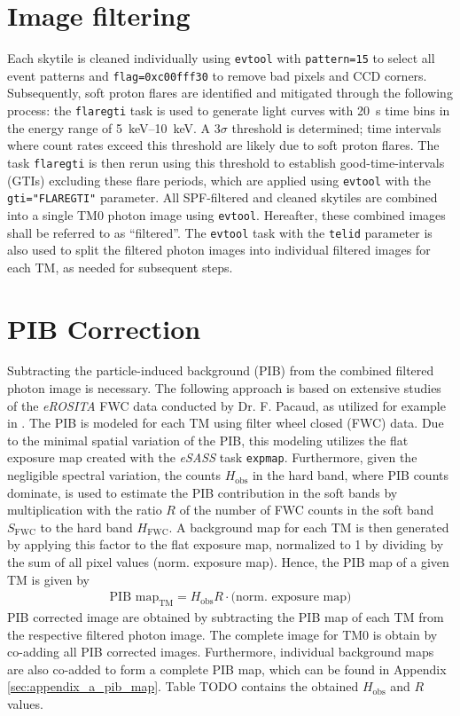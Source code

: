 \section{Image filtering}
Each skytile is cleaned individually using \texttt{evtool} with \texttt{pattern=15} to select all event patterns and \texttt{flag=0xc00fff30} to remove bad pixels and CCD corners. Subsequently, soft proton flares are identified and mitigated through the following process: the \texttt{flaregti} task is used to generate light curves with \SI{20}{\second} time bins in the energy range of \SIrange{5}{10}{\kilo\electronvolt}. A \(3\sigma\) threshold is determined; time intervals where count rates exceed this threshold are likely due to soft proton flares. The task \texttt{flaregti} is then rerun using this threshold to establish good-time-intervals (GTIs) excluding these flare periods, which are applied using \texttt{evtool} with the \texttt{gti="FLAREGTI"} parameter. All SPF-filtered and cleaned skytiles are combined into a single TM0 photon image using \texttt{evtool}. Hereafter, these combined images shall be referred to as \enquote{filtered}. The \texttt{evtool} task with the \texttt{telid} parameter is also used to split the filtered photon images into individual filtered images for each TM, as needed for subsequent steps.
%
\section{PIB Correction}
Subtracting the particle-induced background (PIB) from the combined filtered photon image is necessary. The following  approach is based on extensive studies of the \textit{eROSITA} FWC data conducted by Dr. F. Pacaud, as utilized for example in \cite{Reiprich2021}.  The PIB is modeled for each TM using filter wheel closed (FWC) data. Due to the minimal spatial variation of the PIB, this modeling utilizes the flat exposure map created with the \textit{eSASS} task \texttt{expmap}. Furthermore, given the negligible spectral variation, the counts \(H_\text{obs}\) in the hard band, where PIB counts dominate, is used to estimate the PIB contribution in the soft bands by multiplication with the ratio \(R\) of the number of FWC counts in the soft band \(S_{\text{FWC}}\) to the hard band \(H_\text{FWC}\). A background map for each TM is then generated by applying this factor to the flat exposure map, normalized to 1 by dividing by the sum of all pixel values (norm. exposure map). Hence, the PIB map of a given TM is given by
\begin{align*}
    \text{PIB map}_\text{TM} = H_\text{obs}R\cdot\bigl(\text{norm. exposure map}\bigr)
\end{align*}
PIB corrected image are obtained by subtracting the PIB map of each TM from the respective filtered photon image. The complete image for TM0 is obtain by co-adding all PIB corrected images. Furthermore, individual background maps are also co-added to form a complete PIB map, which can be found in Appendix \ref{sec:appendix_a_pib_map}. Table TODO contains the obtained \(H_\text{obs}\) and \(R\) values.
%
